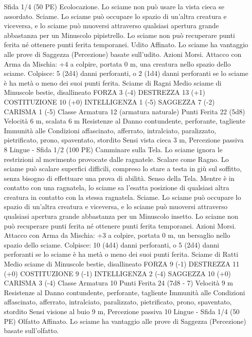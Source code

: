 \begin{multicols}{2}
Sfida 1/4 (50 PE)
Ecolocazione. Lo sciame non può usare la vista cieca se
assordato.
Sciame. Lo sciame può occupare lo spazio di un’altra creatura e
viceversa, e lo sciame può muoversi attraverso qualsiasi apertura
grande abbastanza per un Minuscolo pipistrello. Lo sciame non
può recuperare punti ferita né ottenere punti ferita temporanei.
Udito Affinato. Lo sciame ha vantaggio alle prove di Saggezza
(Percezione) basate sull’udito.
Azioni
Morsi. Attacco con Arma da Mischia: +4 a colpire, portata 0 m,
una creatura nello spazio dello sciame.
Colpisce: 5 (2d4) danni perforanti, o 2 (1d4) danni perforanti se
lo sciame è ha metà o meno dei suoi punti ferita.
Sciame di Ragni
Medio sciame di Minuscole bestie, disallineato
FORZA 3 (-4)
DESTREZZA 13 (+1)
COSTITUZIONE 10 (+0)
INTELLIGENZA 1 (-5)
SAGGEZZA 7 (-2)
CARISMA 1 (-5)
Classe Armatura 12 (armatura naturale)
Punti Ferita 22 (5d8)
Velocità 6 m, scalata 6 m
Resistenze al Danno contundente, perforante, tagliente
Immunità alle Condizioni affascinato, afferrato, intralciato,
paralizzato, pietrificato, prono, spaventato, stordito
Sensi vista cieca 3 m, Percezione passiva 8
Lingue -
Sfida 1/2 (100 PE)
Camminare sulla Tela. Lo sciame ignora le restrizioni al
movimento provocate dalle ragnatele.
Scalare come Ragno. Lo sciame può scalare superfici difficili,
compreso lo stare a testa in giù sul soffitto, senza bisogno di
effettuare una prova di abilità.
Senso della Tela. Mentre è in contatto con una ragnatela, lo
sciame sa l’esatta posizione di qualsiasi altra creatura in contatto
con la stessa ragnatela.
Sciame. Lo sciame può occupare lo spazio di un’altra creatura e
viceversa, e lo sciame può muoversi attraverso qualsiasi apertura
grande abbastanza per un Minuscolo insetto. Lo sciame non può
recuperare punti ferita né ottenere punti ferita temporanei.
Azioni
Morsi. Attacco con Arma da Mischia: +3 a colpire, portata 0 m,
un bersaglio nello spazio dello sciame.
Colpisce: 10 (4d4) danni perforanti, o 5 (2d4) danni perforanti se
lo sciame è ha metà o meno dei suoi punti ferita.
Sciame di Ratti
Medio sciame di Minuscole bestie, disallineato
FORZA 9 (-1)
DESTREZZA 11 (+0)
COSTITUZIONE 9 (-1)
INTELLIGENZA 2 (-4)
SAGGEZZA 10 (+0)
CARISMA 3 (-4)
Classe Armatura 10
Punti Ferita 24 (7d8 - 7)
Velocità 9 m
Resistenze al Danno contundente, perforante, tagliente
Immunità alle Condizioni affascinato, afferrato, intralciato,
paralizzato, pietrificato, prono, spaventato, stordito
Sensi visione al buio 9 m, Percezione passiva 10
Lingue -
Sfida 1/4 (50 PE)
Olfatto Affinato. Lo sciame ha vantaggio alle prove di Saggezza
(Percezione) basate sull’olfatto.

\end{multicols}
